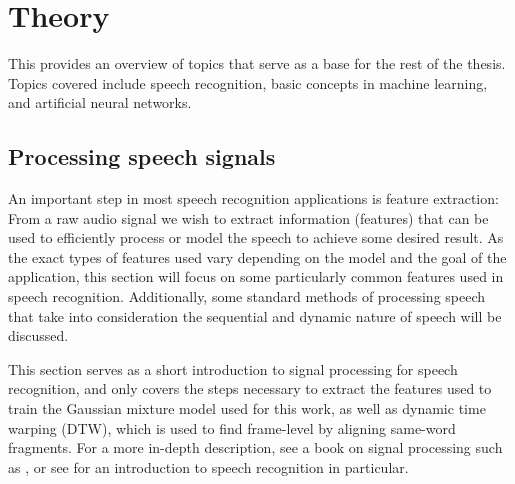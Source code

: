 %
%
%

\chapter{Theory}
\label{ch:theory}

This  provides an overview of topics that serve as a base for the rest of the thesis.
Topics covered include speech recognition, basic concepts in machine learning, and artificial neural networks.

\section{Processing speech signals}

An important step in most speech recognition applications is feature extraction: From a raw audio signal we wish to extract information (features) that can be used to efficiently process or model the speech to achieve some desired result.
As the exact types of features used vary depending on the model and the goal of the application, this section will focus on some particularly common features used in speech recognition.
Additionally, some standard methods of processing speech that take into consideration the sequential and dynamic nature of speech will be discussed.

This section serves as a short introduction to signal processing for speech recognition, and only covers the steps necessary to extract the features used to train the Gaussian mixture model used for this work, as well as dynamic time warping (DTW), which is used to find frame-level by aligning same-word fragments.
For a more in-depth description, see a book on signal processing such as \textcite{quatieri2002discrete}, or see \textcite{huang2001spoken} for an introduction to speech recognition in particular.


